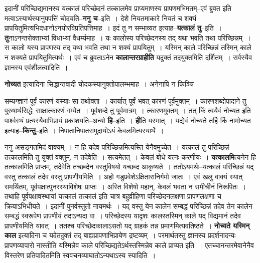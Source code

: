 \documentclass[article,12pt,a4paper]{memoir}
\begin{document}
	  \pstart इदानीं परिच्छिद्यमानस्य यत्कालं परिच्छेदनं तत्कालमेव प्राप्यमाणस्य प्रापणमभिमतम्--एवं ब्रुवत इति मत्वाऽस्यार्थस्यानुपपत्तिं चोदयति--\textbf{ननु च}--इति । देशे नियतमाकारे नियतं च शक्यं प्रापयितुमित्यभिदधानोऽनयोरविप्रतिपत्तिमाह । इदं तु न सम्भाव्यत इत्याह--\textbf{यत्कालं तु}--इति । \textbf{तु}नाऽनन्तरोक्ताभ्यां विधाभ्यां वैधर्म्यमाह । यः कालोस्य परिच्छेदनस्य तद् यथा भवति तथा परिच्छिन्नम् । स कालो यस्य प्रापणस्य तद् यथा भवति तथा न शक्यं प्रापयितुम् । यस्मिन् काले परिच्छिन्नं तस्मिन् काले न शक्यते प्रापयितुमित्यर्थः । एवं च ब्रुवताऽनेन \textbf{कालान्तरग्राहीति} यदुक्तं तदयुक्तमिति दर्शितम् । सर्वस्यैव ज्ञानस्य एवंशीलत्वादिति ।
	\pend
      

	  \pstart \textbf{नोच्यत} इत्यादिना सिद्धान्तवादी चोदकस्यानुक्तोपालम्भमाह । अनेनापि न किञ्चि \leavevmode{} 
	  
	सम्यग्ज्ञानं पूर्वं कारणं यस्याः सा तथोक्ता । कार्यात् पूर्वं भवत् कारणं पूर्वमुक्तम् । कारणशब्दोपादाने तु पुरुषार्थसिद्धेः साक्षात्कारणं गम्येत । पूर्वशब्दे तु पूर्वमात्रम् । त्कारणमुक्तम् । तत् किं त्वयैवं नोच्यत इति पार्श्वस्थं प्रत्यस्यैवाभिप्रायं प्रकाशयति--अन्यो \textbf{हि}--इति । \textbf{ही}ति यस्मात् । यद्येवं नोच्यते तर्हि किं नामोच्यत इत्याह--\textbf{किन्तु}--इति । निपातानिपातसमुदायोऽयं केवलमित्यस्यार्थे ।
	\pend
      

	  \pstart ननु असङ्गतमिदं वाक्यम् । न हि यदेव परिच्छिन्नमित्यस्ति येनैवमुच्येत । यत्कालं तु परिच्छिन्नं तत्कालमिति तु युक्तं वक्तुम्, न तदेवेति । सत्यमेतत् । केवलं बोधे यत्नः करणीयः । \textbf{यत्कालमि}त्यनेन हि तत्कालमिति प्राप्तम्, तदेवेति तच्छब्देन वस्तुविषयो यच्छब्द आकृष्यते । ततोऽयमर्थः--यत्कालं परिच्छिन्नं यद् वस्तु तत्कालं तदेव वस्तु प्रापणीयमिति । अहो गडुप्रवेशेऽक्षितारानिर्गमो जातः । एवं खलु वाक्यं स्यात् समर्थितम्, पूर्वपक्षात्पुनरस्याविशेषः प्राप्तः । अस्ति विशेषो महान्, केवलं भवता न समीचीनं निरूपितः । तथाहि पूर्वपक्षावस्थायां यत्कालं तत्कालं इति चात्र बहुव्रीहिणा परिच्छेदनलक्षणा प्रापणलक्षणा च क्रियाऽभिधीयते । इदानीं पुनर्वस्तुतो नायमर्थः । यद् वस्तु येन कालेन सम्बद्धं परिच्छिन्नं तदेव तेन कालेन सम्बद्धं स्वरूपेण प्रापणीयं तदाऽन्यदा वा । परिच्छेदस्य यादृशः कालस्तस्मिन् काले यद् विद्यमानं तदेव प्रापणीयमिति यावत् । ततश्च परिच्छेदका\leavevmode{}लाऽसतो यद् ग्राहकं तन्न प्रमाणमित्यवतिष्ठते । \textbf{नोच्यते यस्मिन् काल} इत्यादिना च यदेतदुक्तं तद् बाह्यप्रापणाभिप्रायेण द्रष्टव्यम् । परमार्थतस्तु ज्ञानस्य प्रदर्शनादन्यः प्रापणव्यापारो नास्तीति यस्मिन्नेव काले परिच्छिद्यतेऽर्थस्तस्मिन्नेव काले प्राप्यत इति । एतच्चानन्तरमेवानेनैव विस्तरेण प्रतिपादितमिति स्ववचनव्याघातोऽन्यथाऽस्य स्यादिति ।
	\pend
      
\end{document}
